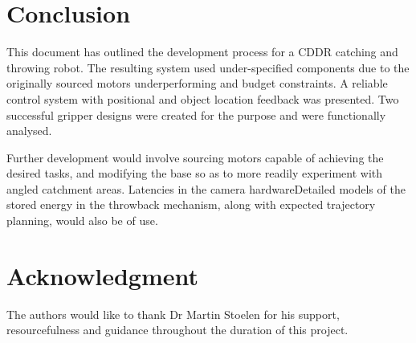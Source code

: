 \documentclass[conference]{IEEEtran}
\begin{document}
	\section{Conclusion}
	This document has outlined the development process for a CDDR catching and throwing robot. The resulting system used under-specified components due to the originally sourced motors underperforming and budget constraints. A reliable control system with positional and object location feedback was presented. Two successful gripper designs were created for the purpose and were functionally analysed.
	
	Further development would involve sourcing motors capable of achieving the desired tasks, and modifying the base so as to more readily experiment with angled catchment areas. Latencies in the camera hardwareDetailed models of the stored energy in the throwback mechanism, along with expected trajectory planning, would also be of use.

	
	
	\section*{Acknowledgment}
	
	
	The authors would like to thank Dr Martin Stoelen for his support, resourcefulness and guidance throughout the duration of this project.
	
	
	
	
	
	
	
	
	{}
	
	

	
	
\end{document}
